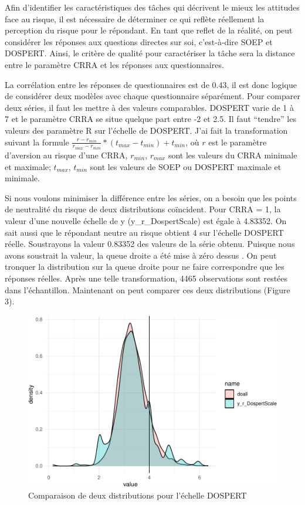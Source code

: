 \documentclass[12pt]{article}
\begin{document}
Afin d'identifier les caractéristiques des tâches qui décrivent le mieux
les attitudes face au risque, il est nécessaire de déterminer ce qui
reflète réellement la perception du risque pour le répondant. En tant
que reflet de la réalité, on peut considérer les réponses aux questions
directes sur soi, c'est-à-dire SOEP et DOSPERT. Ainsi, le critère de
qualité pour caractériser la tâche sera la distance entre le paramètre
CRRA et les réponses aux questionnaires.

La corrélation entre les réponses de questionnaires est de 0.43, il est
donc logique de considérer deux modèles avec chaque questionnaire
séparément. Pour comparer deux séries, il faut les mettre à des valeurs
comparables. DOSPERT varie de 1 à 7 et le paramètre CRRA se situe
quelque part entre -2 et 2.5. Il faut ``tendre'' les valeurs des
paramètre R sur l'échelle de DOSPERT. J'ai fait la transformation
suivant la formule
\(\frac{r - r_{min}}{r_{max} - r_{min}} * (t_{max} - t_{min}) + t_{min}\),
où \(r\) est le paramètre d'aversion au risque d'une CRRA, \(r_{min}\),
\(r_{max}\) sont les valeurs du CRRA minimale et maximale; \(t_{max}\),
\(t_{min}\) sont les valeurs de SOEP ou DOSPERT maximale et minimale.

Si nous voulons minimiser la différence entre les séries, on a besoin
que les points de neutralité du risque de deux distributions coïncident.
Pour CRRA = 1, la valeur d'une nouvelle échelle de y
(y\_r\_DospertScale) est égale à 4.83352. On sait aussi que le répondant
neutre au risque obtient 4 sur l'échelle DOSPERT réelle. Soustrayons la
valeur 0.83352 des valeurs de la série obtenu. Puisque nous avons
soustrait la valeur, la queue droite a été mise à zéro dessus . On peut
tronquer la distribution sur la queue droite pour ne faire correspondre
que les réponses réelles. Après une telle transformation, 4465
observations sont restées dans l'échantillon. Maintenant on peut
comparer ces deux distributions (Figure 3).

\begin{figure}
\centering
\includegraphics{Report-de-stage_PC_files/figure-latex/distdospert-1}
\caption{Comparaison de deux distributions pour l'échelle DOSPERT}
\end{figure}
\end{document}
